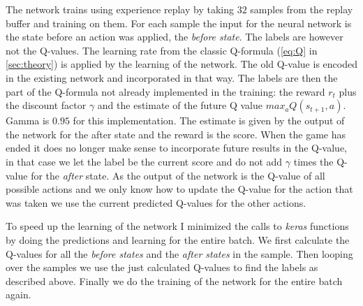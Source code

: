 The network trains using experience replay by taking $32$ samples from the replay buffer and training on them. For each sample the input for the neural network is the state before an action was applied, the \textit{before state}. The labels are however not the Q-values. The learning rate from the classic Q-formula (\autoref{eq:Q} in \autoref{sec:theory}) is applied by the learning of the network. The old Q-value is encoded in the existing network and incorporated in that way. The labels are then the part of the Q-formula not already implemented in the training: the reward $r_t$ plus the discount factor $\gamma$ and the estimate of the future Q value ${max}_a Q(s_{t+1},a)$. Gamma is $0.95$ for this implementation. The estimate is given by the output of the network for the after state and the reward is the score. When the game has ended it does no longer make sense to incorporate future results in the Q-value, in that case we let the label be the current score and do not add $\gamma$ times the Q-value for the \textit{after} state. As the output of the network is the Q-value of all possible actions and we only know how to update the Q-value for the action that was taken we use the current predicted Q-values for the other actions. 

To speed up the learning of the network I minimized the calls to \textit{keras} functions by doing the predictions and learning for the entire batch. We first calculate the Q-values for all the \textit{before states} and the \textit{after states} in the sample. Then looping over the samples we use the just calculated Q-values to find the labels as described above. Finally we do the training of the network for the entire batch again.